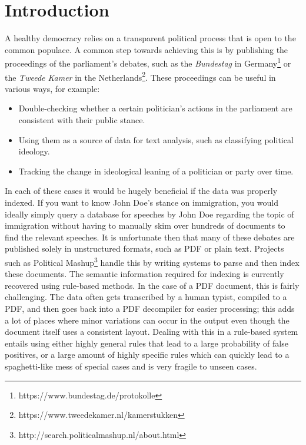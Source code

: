 \section{Introduction}
A healthy democracy relies on a transparent political process that is open to
the common populace. A common step towards achieving this is by publishing the
proceedings of the parliament's debates, such as the \emph{Bundestag} in
Germany\footnote{https://www.bundestag.de/protokolle} or the \emph{Tweede Kamer}
in the Netherlands\footnote{https://www.tweedekamer.nl/kamerstukken}.  These
proceedings can be useful in various ways, for example:
\begin{itemize}
  \item Double-checking whether a certain politician's actions in the parliament
    are consistent with their public stance.
  \item Using them as a source of data for text analysis, such as classifying
    political ideology\citep{ideology}.
  \item Tracking the change in ideological leaning of a politician or party over
    time\cite{mittromney}.
\end{itemize}
In each of these cases it would be hugely beneficial if the data was properly
indexed. If you want to know John Doe's stance on immigration, you would ideally
simply query a database for speeches by John Doe regarding the topic of
immigration without having to manually skim over hundreds of documents to find
the relevant speeches.  It is unfortunate then that many of these debates are
published solely in unstructured formats, such as PDF or plain text.  Projects
such as Political Mashup\footnote{http://search.politicalmashup.nl/about.html}
handle this by writing systems to parse and then index these documents. The
semantic information required for indexing is currently recovered using
rule-based methods. In the case of a PDF document, this is fairly challenging.
The data often gets transcribed by a human typist, compiled to a PDF, and then
goes back into a PDF decompiler for easier processing; this adds a lot of places
where minor variations can occur in the output even though the document itself
uses a consistent layout.  Dealing with this in a rule-based system entails
using either highly general rules that lead to a large probability of false
positives, or a large amount of highly specific rules which can quickly lead to
a spaghetti-like mess of special cases and is very fragile to unseen cases.

